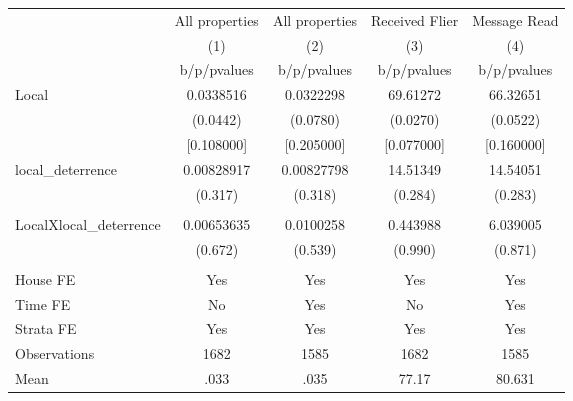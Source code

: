 {
\def\sym#1{\ifmmode^{#1}\else\(^{#1}\)\fi}
\begin{tabular}{l*{4}{c}}
\hline\hline
                &\multicolumn{1}{c}{All properties}&\multicolumn{1}{c}{All properties}&\multicolumn{1}{c}{Received Flier}&\multicolumn{1}{c}{Message Read}\\
                &\multicolumn{1}{c}{(1)}&\multicolumn{1}{c}{(2)}&\multicolumn{1}{c}{(3)}&\multicolumn{1}{c}{(4)}\\
                &b/p/pvalues&b/p/pvalues&b/p/pvalues&b/p/pvalues\\
\hline
Local           &0.0338516&0.0322298& 69.61272& 66.32651\\
                & (0.0442)& (0.0780)& (0.0270)& (0.0522)\\
                &[0.108000]&[0.205000]&[0.077000]&[0.160000]\\
local\_deterrence&0.00828917&0.00827798& 14.51349& 14.54051\\
                &  (0.317)&  (0.318)&  (0.284)&  (0.283)\\
                &         &         &         &         \\
LocalXlocal\_deterrence&0.00653635&0.0100258& 0.443988& 6.039005\\
                &  (0.672)&  (0.539)&  (0.990)&  (0.871)\\
                &         &         &         &         \\
House FE        &      Yes&      Yes&      Yes&      Yes\\
Time FE         &       No&      Yes&       No&      Yes\\
Strata FE       &      Yes&      Yes&      Yes&      Yes\\
\hline
Observations    &     1682&     1585&     1682&     1585\\
Mean            &     .033&     .035&    77.17&   80.631\\
\hline\hline
\end{tabular}
}
